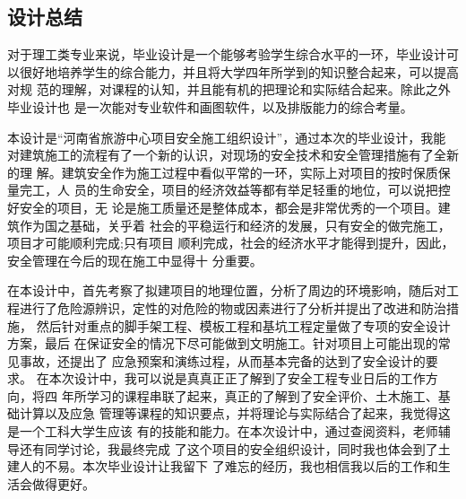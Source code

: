 \begin{center}
    \section*{  \textbf{设计总结}}
    \end{center}

对于理工类专业来说，毕业设计是一个能够考验学生综合水平的一环，毕业设计可
以很好地培养学生的综合能力，并且将大学四年所学到的知识整合起来，可以提高对规
范的理解，对课程的认知，并且能有机的把理论和实际结合起来。除此之外毕业设计也
是一次能对专业软件和画图软件，以及排版能力的综合考量。

本设计是“河南省旅游中心项目安全施工组织设计”，通过本次的毕业设计，我能
对建筑施工的流程有了一个新的认识，对现场的安全技术和安全管理措施有了全新的理
解。建筑安全作为施工过程中看似平常的一环，实际上对项目的按时保质保量完工，人
员的生命安全，项目的经济效益等都有举足轻重的地位，可以说把控好安全的项目，无
论是施工质量还是整体成本，都会是非常优秀的一个项目。建筑作为国之基础，关乎着
社会的平稳运行和经济的发展，只有安全的做完施工，项目才可能顺利完成;只有项目
顺利完成，社会的经济水平才能得到提升，因此，安全管理在今后的现在施工中显得十
分重要。

在本设计中，首先考察了拟建项目的地理位置，分析了周边的环境影响，随后对工
程进行了危险源辨识，定性的对危险的物或因素进行了分析并提出了改进和防治措施，
然后针对重点的脚手架工程、模板工程和基坑工程定量做了专项的安全设计方案，最后
在保证安全的情况下尽可能做到文明施工。针对项目上可能出现的常见事故，还提出了
应急预案和演练过程，从而基本完备的达到了安全设计的要求。
在本次设计中，我可以说是真真正正了解到了安全工程专业日后的工作方向，将四
年所学习的课程串联了起来，真正的了解到了安全评价、土木施工、基础计算以及应急
管理等课程的知识要点，并将理论与实际结合了起来，我觉得这是一个工科大学生应该
有的技能和能力。在本次设计中，通过查阅资料，老师辅导还有同学讨论，我最终完成
了这个项目的安全组织设计，同时我也体会到了土建人的不易。本次毕业设计让我留下
了难忘的经历，我也相信我以后的工作和生活会做得更好。